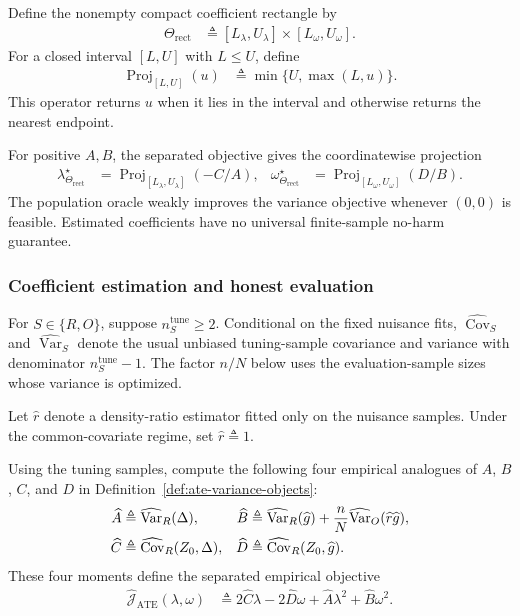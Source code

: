 \begin{definition}
\label{def:interval-projection}
	Define the nonempty compact coefficient rectangle by
	\begin{align}
		\Theta_{\mathrm{rect}}
		&\triangleq
		[L_\lambda,U_\lambda]\times[L_\omega,U_\omega].
		\label{eq:ate-coefficient-rectangle}
	\end{align}
	For a closed interval $[L,U]$ with $L\leq U$, define
	\begin{align}
		\operatorname{Proj}_{[L,U]}(u)
		&\triangleq
		\min\{U,\max(L,u)\}.
		\label{eq:interval-projection}
	\end{align}
	This operator returns $u$ when it lies in the interval and otherwise returns
	the nearest endpoint.
\end{definition}
For positive $A,B$, the separated objective gives the coordinatewise projection
\begin{align*}
	\lambda_{\Theta_{\mathrm{rect}}}^\star
	&=\operatorname{Proj}_{[L_\lambda,U_\lambda]}(-C/A),
	&
	\omega_{\Theta_{\mathrm{rect}}}^\star
	&=\operatorname{Proj}_{[L_\omega,U_\omega]}(D/B).
\end{align*}
The population oracle weakly improves the variance objective whenever $(0,0)$ is feasible. Estimated coefficients have no universal finite-sample no-harm guarantee.

\subsubsection{Coefficient estimation and honest evaluation}

For $S\in\{R,O\}$, suppose $n_S^{\mathrm{tune}}\geq2$. Conditional on the fixed nuisance fits, $\widehat{\operatorname{Cov}}_S$ and $\widehat{\operatorname{Var}}_S$ denote the usual unbiased tuning-sample covariance and variance with denominator $n_S^{\mathrm{tune}}-1$. The factor $n/N$ below uses the evaluation-sample sizes whose variance is
optimized.

Let $\widehat r$ denote a density-ratio estimator fitted only on the nuisance samples. Under the common-covariate regime, set $\widehat r\triangleq 1$.

Using the tuning samples, compute the following four empirical analogues of $A$, $B$, $C$, and $D$ in Definition~\ref{def:ate-variance-objects}:
\begin{align}
\widehat A&\triangleq\widehat{\operatorname{Var}}_R(\Delta),
&
\widehat B&\triangleq\widehat{\operatorname{Var}}_R(\widehat{g})
+\frac nN\widehat{\operatorname{Var}}_O(\widehat r\widehat{g}),
\notag\\
\widehat C&\triangleq\widehat{\operatorname{Cov}}_R(Z_0,\Delta),
&
\widehat D&\triangleq\widehat{\operatorname{Cov}}_R(Z_0,\widehat{g}).
\label{eq:ate-empirical-moments}
\end{align}
These four moments define the separated empirical objective
\begin{align}
\widehat{\mathcal J}_{\mathrm{ATE}}(\lambda,\omega)
&\triangleq
2\widehat C\lambda-2\widehat D\omega
+\widehat A\lambda^2+\widehat B\omega^2.
\label{eq:ate-empirical-objective}
\end{align}

